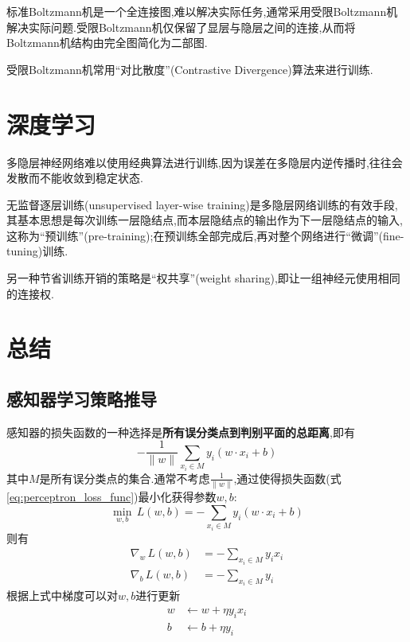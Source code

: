 标准Boltzmann机是一个全连接图,难以解决实际任务,通常采用受限Boltzmann机解决实际问题.受限Boltzmann机仅保留了显层与隐层之间的连接,从而将Boltzmann机结构由完全图简化为二部图.

受限Boltzmann机常用``对比散度''(Contrastive Divergence)算法来进行训练.

\section{深度学习}

多隐层神经网络难以使用经典算法进行训练,因为误差在多隐层内逆传播时,往往会发散而不能收敛到稳定状态.

无监督逐层训练(unsupervised layer-wise training)是多隐层网络训练的有效手段,其基本思想是每次训练一层隐结点,而本层隐结点的输出作为下一层隐结点的输入,这称为``预训练''(pre-training);在预训练全部完成后,再对整个网络进行``微调''(fine-tuning)训练.

另一种节省训练开销的策略是``权共享''(weight sharing),即让一组神经元使用相同的连接权.

\section*{总结}

\subsection*{感知器学习策略推导}

感知器的损失函数的一种选择是\textbf{所有误分类点到判别平面的总距离},即有
\begin{equation}
    -\frac{1}{\|w\|}\sum_{x_i\in M}y_i(w\cdot x_i+b)
\end{equation}
其中$M$是所有误分类点的集合.通常不考虑$\frac{1}{\|w\|}$,通过使得损失函数(式\ref{eq:perceptron_loss_func})最小化获得参数$w,b$:
\begin{equation}\label{eq:perceptron_loss_func}
    \min_{w,b}\,L(w,b)=-\sum_{x_i\in M}y_i(w\cdot x_i+b)
\end{equation}
则有
\begin{equation}\begin{split}
    \nabla_w\,L(w,b)&=-\sum_{x_i\in M}y_ix_i\\
    \nabla_b\,L(w,b)&=-\sum_{x_i\in M}y_i
\end{split}\end{equation}
根据上式中梯度可以对$w,b$进行更新
\begin{equation}\begin{split}
    w&\leftarrow w+\eta y_ix_i\\
    b&\leftarrow b+\eta y_i
\end{split}\end{equation}

